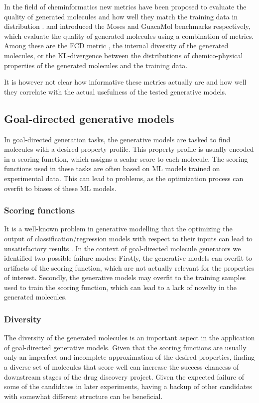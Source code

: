 In the field of cheminformatics new metrics have been proposed to evaluate the
quality of generated molecules and how well they match the training data in
distribution \citep{preuerFrechetChemNetDistance2018}.
\citet{polykovskiyMolecularSetsMOSES2020} and
\citet{brownGuacaMolBenchmarkingModels2019} introduced the Moses and GuacaMol
benchmarks respectively, which evaluate the quality of generated molecules using
a combination of metrics. Among these are the FCD metric
\citep{preuerFrechetChemNetDistance2018}, the internal diversity
\citep{benhendaChemGANChallengeDrug2017} of the generated molecules, or the
KL-divergence between the distributions of chemico-physical properties of the
generated molecules and the training data.

It is however not clear how informative these metrics actually are and how well
they correlate with the actual usefulness of the tested generative models.

\subsection{Goal-directed generative models\label{sec:eval-gen}}

In goal-directed generation tasks, the generative models are tasked to find
molecules with a desired property profile. This property profile is usually 
encoded in a scoring function, which assigns a scalar score to each molecule. 
The scoring functions used in these tasks are often based on ML models trained on experimental
data. This can lead to problems, as the optimization process can overfit to
biases of these ML models. 

\subsubsection{Scoring functions}
It is a well-known problem in generative modelling that the optimizing the
output of classification/regression models with respect to their inputs can lead
to unsatisfactory results \citep{todo}. In the context of goal-directed molecule
generators we identified two possible failure modes: Firstly, the generative
models can overfit to artifacts of the scoring function, which are not actually
relevant for the properties of interest. Secondly, the generative models may
overfit to the training samples used to train the scoring function, which can
lead to a lack of novelty in the generated molecules.

\subsubsection{Diversity}
The diversity of the generated molecules is an important aspect in the
application of goal-directed generative models. Given that the scoring functions
are usually only an imperfect and incomplete approximation of the desired
properties, finding a diverse set of molecules that score well can increase the
success chancess of downstream stages of the drug discovery project. Given the
expected failure of some of the candidates in later experiments, having a backup
of other candidates with somewhat different structure can be beneficial.

